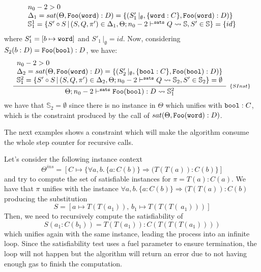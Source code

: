 \documentclass[a4paper, 11pt]{article}
\theoremstyle{definition}
\begin{document}
\begin{Example}
\[          {\begin{array}{l}
              n_0 - 2 > 0\\
              \Delta_1 = sat(\Theta, \mathtt{Foo}(\word) : D) = \{(S'_1\,|_\emptyset, \{\word : C\}, \mathtt{Foo}(\word) : D)\}\\
              \mathbb{S}^1_1 = \{S'\circ S\,|\,(S,Q,\pi') \in \Delta_1, \sats{Q}{\mathbb{S}}{n_0 - 2}, S' \in \mathbb{S}\} = \{id\}
           \end{array}}
  \]
  where $S'_1 = [b\mapsto \word]$ and $S'_1\,|_\emptyset = id$. Now, considering 
  $S_2(b : D) =\mathtt{Foo}(\bool) : D$, we have:
  \[
    \infer[_{\{SInst\}}]
          {\sats{\mathtt{Foo}(\bool) : D}{\mathbb{S}^2_1}{n_0 - 2}}
          {\begin{array}{l}
              n_0 - 2 > 0\\
              \Delta_2 = sat(\Theta, \mathtt{Foo}(\word) : D) = \{(S'_2\,|_\emptyset, \{\bool : C\}, \mathtt{Foo}(\bool) : D)\}\\
              \mathbb{S}^2_1 = \{S'\circ S\,|\,(S,Q,\pi') \in \Delta_2, \sats{Q}{\mathbb{S}_2}{n_0 - 2}, S' \in \mathbb{S}_2\} = \emptyset 
           \end{array}}
  \]
  we have that $\mathbb{S}_2 = \emptyset$ since there is no instance in $\Theta$ which 
  unifies with $\bool : C$, which is the constraint produced by the call 
  of $sat(\Theta,\mathtt{Foo}(\word) : D)$.
\end{Example}

The next examples shows a constraint which will make the algorithm 
consume the whole step counter for recursive calls.

\begin{Example}
Let's consider the following instance context 
\[
  \Theta^{ins} = [C \mapsto \{\forall a,b.\,\{a : C(b)\} \Rightarrow (T(T(a)) : C(b)\}]
\]
and try to compute the set of satisfiable instances for 
$\pi = T(a) : C(a)$. 
We have that $\pi$ unifies with the 
instance $\forall a,b.\,\{a : C(b)\} \Rightarrow (T(T(a)) : C(b)$ 
producing the substitution 
\[
  S= [a \mapsto T(T(a_1)),\, b_1 \mapsto T(T(T(\:a_1)))]
\] 
Then, we need to recursively compute the satisfiability of 
\[
  S(a_1 : C(b_1)) = T(T(a_1)) : C(T(T(T(a_1))))
\] 
which unifies again with the same instance, leading the process into 
an infinite loop. Since the satisfiability test uses a 
fuel parameter to ensure termination, the loop will not happen 
but the algorithm will return an error due to not having enough 
gas to finish the computation. 
\end{Example}
\end{document}

